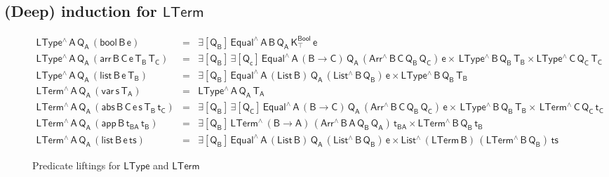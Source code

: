 \documentclass[sigplan,10pt,anonymous,review]{acmart}
\begin{document}
\subsection{(Deep) induction for $\mathsf{LTerm}$}\label{sec:ind-lam} 

\begin{figure*}[t]


  \begin{adjustbox}{varwidth=7.3in, max width=7.1in, margin=-0.0in 0in
      -0.2in 0in, fbox, center} 

  {\small
\[\begin{array}{lll}
\mathsf{LType^{\wedge}\,A\,Q_A\,(bool\,B\,e)} & = &\mathsf{\exists
  [Q_B]\, Equal^{\wedge}\, A\, B\, Q_A\, K^{Bool}_{\top} \,e}\\
\mathsf{LType^{\wedge}\,A\,Q_A\,(arr\, B\, C\, e\, T_B\, T_C)}
&=&\mathsf{\exists [Q_B] \,\exists [Q_c]\, Equal^{\wedge}\,A\,
  (B \to C)\, Q_A\, (Arr^{\wedge} \, B\, C\, Q_B \, Q_C) \, e \times
  \, LType^{\wedge}\,B\,Q_B\,T_B \times LType^{\wedge}\,C\,Q_C\,T_C}\\
\mathsf{LType^{\wedge}\,A\,Q_A\,(list\, B\, e\, T_B)} & = &
\mathsf{\exists [Q_B]\, Equal^{\wedge}\,A\, (List\, B)\, Q_A\,
  (List^{\wedge} \, B\, Q_B) \, e \times LType^{\wedge}\,B\,Q_B\,T_B}\\[1ex]
\mathsf{LTerm^{\wedge}\,A\,Q_A\,(var\,s\,T_A)} & = &
\mathsf{LType^{\wedge}\, A\, Q_A\, T_A}\\
\mathsf{LTerm^{\wedge}\,A\,Q_A\, (abs \,B \,C \,e \,s \,T_B \,t_C)} &
= & \mathsf{\exists [Q_B]\,\exists [Q_C]\, Equal^{\wedge} \, A\, (B \to
  C)\, Q_A\, (Arr^{\wedge} \, B\, C\, Q_B \, Q_C)\, e \times \,
  LType^{\wedge}\, B\, Q_B\, T_B \times \, LTerm^{\wedge}\, C\, Q_C\,
  t_C }\\
\mathsf{LTerm^{\wedge}\,A\,Q_A\, (app\, B\, t_{BA}\, t_B)} & = &
\mathsf{\exists [Q_B]\, LTerm^{\wedge}\, (B \to A)\, (Arr^{\wedge} \,
  B\, A\, Q_B \, Q_A)\, t_{BA} \times LTerm^{\wedge}\, B\, Q_B\,
  t_B}\\
\mathsf{LTerm^{\wedge}\,A\,Q_A\, (list\, B\, e\, ts)} & = &
\mathsf{\exists [Q_B]\, Equal^{\wedge} \, A\, (List\,B)\, Q_A\,
  (List^{\wedge} \, B\, Q_B) \, e \times List^{\wedge}\, (LTerm\,B) \,
  (LTerm^{\wedge} \, B\, Q_B) \, ts}
\end{array}   \]}

\vspace*{-0.1in}

\caption{Predicate liftings for $\mathsf{LType}$ and
  $\mathsf{LTerm}$}\label{fig:liftings} \vspace*{0.1in} 
\end{adjustbox}
\end{figure*}
\end{document}
